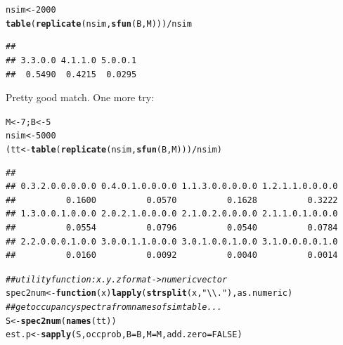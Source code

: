 \documentclass{article}\usepackage[]{graphicx}\usepackage[]{color}
\makeatletter
\newcommand{\hlnum}[1]{\textcolor[rgb]{0.686,0.059,0.569}{#1}}%
\newcommand{\hlstr}[1]{\textcolor[rgb]{0.192,0.494,0.8}{#1}}%
\newcommand{\hlcom}[1]{\textcolor[rgb]{0.678,0.584,0.686}{\textit{#1}}}%
\newcommand{\hlopt}[1]{\textcolor[rgb]{0,0,0}{#1}}%
\newcommand{\hlstd}[1]{\textcolor[rgb]{0.345,0.345,0.345}{#1}}%
\newcommand{\hlkwa}[1]{\textcolor[rgb]{0.161,0.373,0.58}{\textbf{#1}}}%
\newcommand{\hlkwb}[1]{\textcolor[rgb]{0.69,0.353,0.396}{#1}}%
\newcommand{\hlkwc}[1]{\textcolor[rgb]{0.333,0.667,0.333}{#1}}%
\newcommand{\hlkwd}[1]{\textcolor[rgb]{0.737,0.353,0.396}{\textbf{#1}}}%
\newenvironment{kframe}{%
 \def\at@end@of@kframe{}%
 \ifinner\ifhmode%
  \def\at@end@of@kframe{\end{minipage}}%
  \begin{minipage}{\columnwidth}%
 \fi\fi%
 \def\FrameCommand##1{\hskip\@totalleftmargin \hskip-\fboxsep
 \colorbox{shadecolor}{##1}\hskip-\fboxsep
     \hskip-\linewidth \hskip-\@totalleftmargin \hskip\columnwidth}%
 \MakeFramed {\advance\hsize-\width
   \@totalleftmargin\z@ \linewidth\hsize
   \@setminipage}}%
 {\par\unskip\endMakeFramed%
 \at@end@of@kframe}
\newenvironment{knitrout}{}{} %
\makeatother
\begin{document}
\begin{knitrout}
\color{fgcolor}\begin{kframe}
\begin{alltt}
\hlstd{nsim} \hlkwb{<-} \hlnum{2000}
\hlkwd{table}\hlstd{(}\hlkwd{replicate}\hlstd{(nsim,}\hlkwd{sfun}\hlstd{(B,M)))}\hlopt{/}\hlstd{nsim}
\end{alltt}
\begin{verbatim}
## 
## 3.3.0.0 4.1.1.0 5.0.0.1 
##  0.5490  0.4215  0.0295
\end{verbatim}
\end{kframe}
\end{knitrout}

Pretty good match.  One more try:

\begin{knitrout}
\color{fgcolor}\begin{kframe}
\begin{alltt}
\hlstd{M} \hlkwb{<-} \hlnum{7}\hlstd{; B} \hlkwb{<-} \hlnum{5}
\hlstd{nsim} \hlkwb{<-} \hlnum{5000}
\hlstd{(tt} \hlkwb{<-} \hlkwd{table}\hlstd{(}\hlkwd{replicate}\hlstd{(nsim,}\hlkwd{sfun}\hlstd{(B,M)))}\hlopt{/}\hlstd{nsim)}
\end{alltt}
\begin{verbatim}
## 
## 0.3.2.0.0.0.0.0 0.4.0.1.0.0.0.0 1.1.3.0.0.0.0.0 1.2.1.1.0.0.0.0 
##          0.1600          0.0570          0.1628          0.3222 
## 1.3.0.0.1.0.0.0 2.0.2.1.0.0.0.0 2.1.0.2.0.0.0.0 2.1.1.0.1.0.0.0 
##          0.0554          0.0796          0.0540          0.0784 
## 2.2.0.0.0.1.0.0 3.0.0.1.1.0.0.0 3.0.1.0.0.1.0.0 3.1.0.0.0.0.1.0 
##          0.0160          0.0092          0.0040          0.0014
\end{verbatim}
\end{kframe}
\end{knitrout}
\begin{knitrout}
\color{fgcolor}\begin{kframe}
\begin{alltt}
\hlcom{## utility function: x.y.z format -> numeric vector}
\hlstd{spec2num} \hlkwb{<-} \hlkwa{function}\hlstd{(}\hlkwc{x}\hlstd{)} \hlkwd{lapply}\hlstd{(}\hlkwd{strsplit}\hlstd{(x,}\hlstr{"\textbackslash{}\textbackslash{}."}\hlstd{),as.numeric)}
\hlcom{## get occupancy spectra from names of sim table ...}
\hlstd{S} \hlkwb{<-} \hlkwd{spec2num}\hlstd{(}\hlkwd{names}\hlstd{(tt))}
\hlstd{est.p} \hlkwb{<-} \hlkwd{sapply}\hlstd{(S,occprob,}\hlkwc{B}\hlstd{=B,}\hlkwc{M}\hlstd{=M,}\hlkwc{add.zero}\hlstd{=}\hlnum{FALSE}\hlstd{)}
\end{alltt}
\end{kframe}
\end{knitrout}
\end{document}
